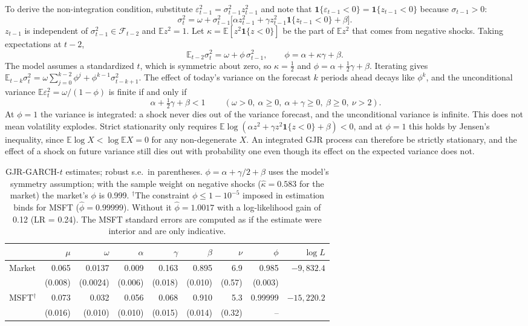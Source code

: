 \documentclass[11pt]{article}
\newcommand{\E}{\mathbb{E}}
\newcommand{\1}{\mathbf{1}}
\begin{document}
To derive the non-integration condition, substitute $\varepsilon_{t-1}^2=\sigma_{t-1}^2z_{t-1}^2$
and note that $\1\{\varepsilon_{t-1}<0\}=\1\{z_{t-1}<0\}$ because $\sigma_{t-1}>0$:
\[
\sigma_t^2=\omega+\sigma_{t-1}^2\big[\alpha z_{t-1}^2+\gamma z_{t-1}^2\1\{z_{t-1}<0\}+\beta\big].
\]
$z_{t-1}$ is independent of $\sigma_{t-1}^2\in\mathcal F_{t-2}$ and $\E z^2=1$. Let
$\kappa=\E[z^2\1\{z<0\}]$ be the part of $\E z^2$ that comes from negative shocks. Taking
expectations at $t-2$,
\[
\E_{t-2}\sigma_t^2=\omega+\phi\,\sigma_{t-1}^2,\qquad \phi=\alpha+\kappa\gamma+\beta .
\]
The model assumes a standardized $t$, which is symmetric about zero, so $\kappa=\tfrac12$ and
$\phi=\alpha+\tfrac12\gamma+\beta$. Iterating gives
$\E_{t-k}\sigma_t^2=\omega\sum_{j=0}^{k-2}\phi^j+\phi^{k-1}\sigma_{t-k+1}^2$. The effect of
today's variance on the forecast $k$ periods ahead decays like $\phi^{k}$, and the
unconditional variance $\E\varepsilon_t^2=\omega/(1-\phi)$ is finite if and only if
\[
\boxed{\ \alpha+\tfrac12\gamma+\beta<1\ }
\qquad(\omega>0,\ \alpha\ge0,\ \alpha+\gamma\ge0,\ \beta\ge0,\ \nu>2).
\]
At $\phi=1$ the variance is integrated: a shock never dies out of the variance forecast, and
the unconditional variance is infinite. This does not mean volatility explodes. Strict
stationarity only requires $\E\log(\alpha z^2+\gamma z^2\1\{z<0\}+\beta)<0$, and at $\phi=1$
this holds by Jensen's inequality, since $\E\log X<\log\E X=0$ for any non-degenerate $X$. An
integrated GJR process can therefore be strictly stationary, and the effect of a shock on
future variance still dies out with probability one even though its effect on the expected
variance does not.

\begin{table}[!htb]
\centering
\small
\begin{tabular}{lrrrrrrrr}
\toprule
 & $\mu$ & $\omega$ & $\alpha$ & $\gamma$ & $\beta$ & $\nu$ & $\phi$ & $\log L$ \\
\midrule
Market & 0.065 & 0.0137 & 0.009 & 0.163 & 0.895 & 6.9 & 0.985 & $-9{,}832.4$ \\
       & (0.008) & (0.0024) & (0.006) & (0.018) & (0.010) & (0.57) & (0.003) & \\
MSFT$^\dagger$ & 0.073 & 0.032 & 0.056 & 0.068 & 0.910 & 5.3 & 0.99999 & $-15{,}220.2$ \\
       & (0.016) & (0.010) & (0.010) & (0.015) & (0.014) & (0.32) & -- & \\
\bottomrule
\end{tabular}
\caption{GJR-GARCH-$t$ estimates; robust s.e.\ in parentheses. $\phi=\alpha+\gamma/2+\beta$
uses the model's symmetry assumption; with the sample weight on negative shocks
($\hat\kappa=0.583$ for the market) the market's $\phi$ is 0.999.
$^\dagger$The constraint $\phi\le1-10^{-5}$ imposed in estimation binds for MSFT
($\hat\phi=0.99999$). Without it $\hat\phi=1.0017$ with a log-likelihood gain of 0.12
(LR = 0.24). The MSFT standard errors are computed as if the estimate were interior and are
only indicative.}
\end{table}
\end{document}
